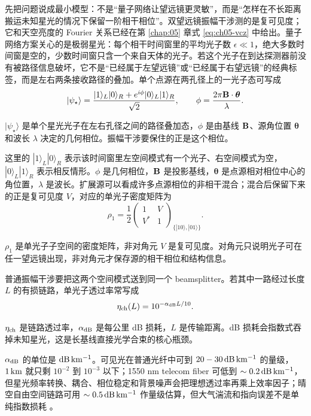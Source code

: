 先把问题说成最小模型：不是“量子网络让望远镜更灵敏”，而是“怎样在不长距离搬运未知星光的情况下保留一阶相干相位”。双望远镜振幅干涉测的是复可见度；它和天空亮度的 Fourier 关系已经在第 \ref{chap:05} 章式 \eqref{eq:ch05-vcz} 中给出。量子网络方案关心的是极弱星光：每个相干时间窗里的平均光子数 \(\epsilon\ll1\)，绝大多数时间窗是空的，少数时间窗只含一个来自天体的光子。若这个光子在到达探测器前没有被路径信息破坏，它不是“已经属于左望远镜”或“已经属于右望远镜”的经典标签，而是左右两条接收路径的叠加。单个点源在两孔径上的一光子态可写成
\begin{equation}
  |\psi_\star\rangle
  =
  \frac{|1\rangle_L|0\rangle_R
  +
  e^{i\phi}
  |0\rangle_L|1\rangle_R}{\sqrt2},
  \qquad
  \phi
  =
  \frac{2\pi{\bf B}\cdot\boldsymbol\theta}{\lambda}.
  \label{eq:ch17-stellar-single-photon}
\end{equation}
\begin{formulaexplain}[公式 (17.1) 解读]
\(|\psi_\star\rangle\) 是单个星光光子在左右孔径之间的路径叠加态，\(\phi\) 是由基线 \({\bf B}\)、源角位置 \(\boldsymbol\theta\) 和波长 \(\lambda\) 决定的几何相位。振幅干涉要保住的正是这个相位。
\end{formulaexplain}
这里的 \(|1\rangle_L|0\rangle_R\) 表示该时间窗里左空间模式有一个光子、右空间模式为空，\(|0\rangle_L|1\rangle_R\) 表示相反情形。\(\phi\) 是几何相位，\({\bf B}\) 是投影基线，\(\boldsymbol\theta\) 是点源相对相位中心的角位置，\(\lambda\) 是波长。扩展源可以看成许多点源相位的非相干混合；混合后保留下来的正是复可见度 \(V\)，对应的单光子密度矩阵为
\begin{equation}
  \rho_1
  =
  \frac{1}{2}
  \begin{pmatrix}
  1 & V\\
  V^* & 1
  \end{pmatrix}_{\{|10\rangle,|01\rangle\}} .
  \label{eq:ch17-single-photon-density}
\end{equation}
\begin{formulaexplain}[公式 (17.2) 解读]
\(\rho_1\) 是单光子子空间的密度矩阵，非对角元 \(V\) 是复可见度。对角元只说明光子可在任一望远镜出现，非对角元才保存源的相干相位和结构信息。
\end{formulaexplain}
普通振幅干涉要把这两个空间模式送到同一个 beamsplitter。若其中一路经过长度 \(L\) 的有损链路，单光子透过率常写成
\begin{equation}
  \eta_{\rm ch}(L)
  =
  10^{-\alpha_{\rm dB}L/10}.
  \label{eq:ch17-link-loss}
\end{equation}
\begin{formulaexplain}[公式 (17.3) 解读]
\(\eta_{\rm ch}\) 是链路透过率，\(\alpha_{\rm dB}\) 是每公里 dB 损耗，\(L\) 是传输距离。dB 损耗会指数式吞掉未知星光，这是长基线直接光学合束的核心瓶颈。
\end{formulaexplain}
\(\alpha_{\rm dB}\) 的单位是 \({\rm dB\,km^{-1}}\)。可见光在普通光纤中可到 \(20-30\,{\rm dB\,km^{-1}}\) 的量级，\(1\,{\rm km}\) 就只剩 \(10^{-2}\) 到 \(10^{-3}\) 以下；1550 nm telecom fiber 可低到 \(\sim0.2\,{\rm dB\,km^{-1}}\)，但星光频率转换、耦合、相位稳定和背景噪声会把理想透过率再乘上效率因子；晴空自由空间链路可用 \(\sim0.5\,{\rm dB\,km^{-1}}\) 作量级估算，但大气湍流和指向误差不是单纯指数损耗 \citep{2012PhRvL.109g0503G,2019PhRvL.123g0504K,2024SPIE13095E..1NR}。

